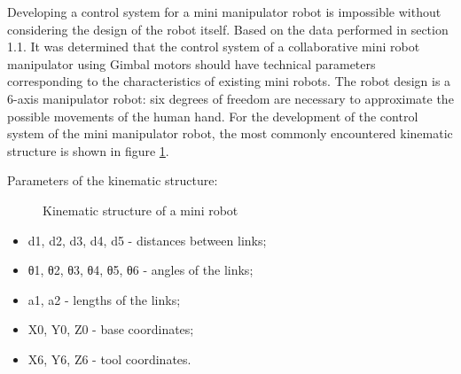 Developing a control system for a mini manipulator robot is impossible without considering the design of the robot itself. Based on the data performed in section 1.1. It was determined that the control system of a collaborative mini robot manipulator using Gimbal motors should have technical parameters corresponding to the characteristics of existing mini robots. The robot design is a 6-axis manipulator robot: six degrees of freedom are necessary to approximate the possible movements of the human hand. For the development of the control system of the mini manipulator robot, the most commonly encountered kinematic structure is shown in figure \ref{Kin}.


Parameters of the kinematic structure:


\begin{figure}[H]
	\centering
	
	\caption{Kinematic structure of a mini robot}
	\label{Kin}
\end{figure}

\begin{itemize}
	\item d1, d2, d3, d4, d5 - distances between links;
	\item θ1, θ2, θ3, θ4, θ5, θ6 - angles of the links;
	\item a1, a2 - lengths of the links;
	\item X0, Y0, Z0 - base coordinates;
	\item X6, Y6, Z6 - tool coordinates.
\end{itemize}

